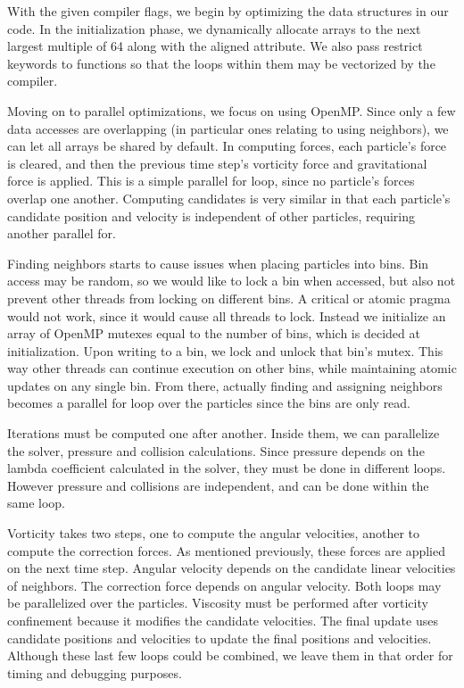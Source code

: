 \documentclass{scrartcl}
\begin{document}
With the given compiler flags, we begin by optimizing the data structures in our code. In the initialization phase, we dynamically allocate arrays to the next largest multiple of 64 along with the aligned attribute. We also pass restrict keywords to functions so that the loops within them may be vectorized by the compiler.

Moving on to parallel optimizations, we focus on using OpenMP. Since only a few data accesses are overlapping (in particular ones relating to using neighbors), we can let all arrays be shared by default. In computing forces, each particle's force is cleared, and then the previous time step's vorticity force and gravitational force is applied. This is a simple parallel for loop, since no particle's forces overlap one another. Computing candidates is very similar in that each particle's candidate position and velocity is independent of other particles, requiring another parallel for.

Finding neighbors starts to cause issues when placing particles into bins. Bin access may be random, so we would like to lock a bin when accessed, but also not prevent other threads from locking on different bins. A critical or atomic pragma would not work, since it would cause all threads to lock. Instead we initialize an array of OpenMP mutexes equal to the number of bins, which is decided at initialization. Upon writing to a bin, we lock and unlock that bin's mutex. This way other threads can continue execution on other bins, while maintaining atomic updates on any single bin. From there, actually finding and assigning neighbors becomes a parallel for loop over the particles since the bins are only read.

Iterations must be computed one after another. Inside them, we can parallelize the solver, pressure and collision calculations. Since pressure depends on the lambda coefficient calculated in the solver, they must be done in different loops. However pressure and collisions are independent, and can be done within the same loop.

Vorticity takes two steps, one to compute the angular velocities, another to compute the correction forces. As mentioned previously, these forces are applied on the next time step. Angular velocity depends on the candidate linear velocities of neighbors. The correction force depends on angular velocity. Both loops may be parallelized over the particles. Viscosity must be performed after vorticity confinement because it modifies the candidate velocities. The final update uses candidate positions and velocities to update the final positions and velocities. Although these last few loops could be combined, we leave them in that order for timing and debugging purposes.
\end{document}
